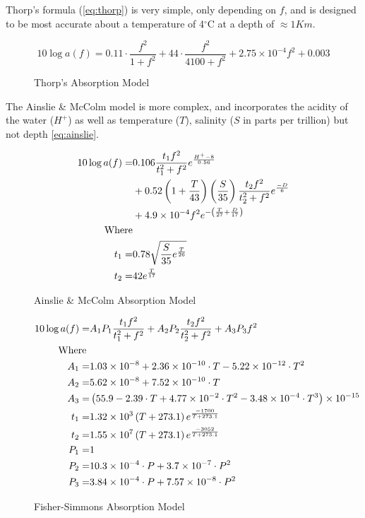Thorp's formula (\autoref{eq:thorp}) is very simple, only depending on $f$, and is designed to be most accurate about a temperature of 4$^{\circ}$C at a depth of $\approx 1Km$.
%
\begin{figure}
  \begin{equation}
    10 \log a(f) = 0.11 \cdot \frac{f^2}{1+f^2} + 44\cdot\frac{f^2}{4100+f^2}+ 2.75\times10^{-4} f^2 + 0.003
    \label{eq:thorp}
  \end{equation}
  \caption[Thorp's formula]{Thorp's Absorption Model\cite{Stojanovic2007}}
    \label{fig:thorp}
\end{figure}
%
The Ainslie \& McColm model is more complex, and incorporates the acidity of the water ($H^+$) as well as temperature ($T$), salinity ($S$ in parts per trillion) but not depth \autoref{eq:ainslie}.
%
\begin{figure}
  \begin{align}
    10 \log a(f) =& 0.106 \frac{t_1 f^2}{t_1^2 + f^2} e^{\frac{H^+-8}{0.56}}\\\notag
      & + 0.52 \left(1+\frac{T}{43}\right)\left(\frac{S}{35}\right)\frac{t_2f^2}{t_2^2+f^2} e^{\frac{-D}{6}}\\\notag
      & + 4.9 \times 10^{-4} f^2e^{-\left(\frac{T}{27}+\frac{D}{17}\right)}\\\notag
      \text{Where}&\\\notag
      t_1 =& 0.78 \sqrt{\frac{S}{35}e^{\frac{T}{26}}}\\\notag
      t_2 =& 42 e^{\frac{T}{17}}\notag
      \label{eq:ainslie}
  \end{align}
  \caption{Ainslie \& McColm Absorption Model}
  \label{fig:ainslie}
\end{figure}
%
\begin{figure}
  \begin{align}
    10 \log a(f)=& A_1P_1\frac{t_1f^2}{t_1^2+f^2} + A_2P_2\frac{t_2f^2}{t_2^2+f^2} + A_3P_3f^2\\\notag
    \text{Where }&\\\notag
    A_1=&1.03\times 10^{-8} + 2.36\times 10^{-10} \cdot T -5.22 \times 10^{-12}\cdot T^2\\\notag
    A_2=&5.62\times 10^{-8} + 7.52\times 10^{-10} \cdot T\\\notag
    A_3=&\left(55.9 - 2.39\cdot T + 4.77\times 10^{-2}\cdot T^2 - 3.48 \times 10^{-4}\cdot T^3\right) \times 10 ^{-15}\\\notag
    t_1=&1.32\times 10^3\left(T+273.1\right)e^{\frac{-1700}{T+273.1}}\\\notag
    t_2=&1.55\times 10^7\left(T+273.1\right)e^{\frac{-3052}{T+273.1}}\\\notag
    P_1=&1\\\notag
    P_2=&\-10.3\times 10^{-4}\cdot P + 3.7\times 10^{-7}\cdot P^2\\\notag
    P_3=&\-3.84\times 10^{-4}\cdot P + 7.57\times 10^{-8}\cdot P^2\notag
    \label{eq:fisher}
  \end{align}
  \caption{Fisher-Simmons Absorption Model}
  \label{fig:fisher}
\end{figure}

